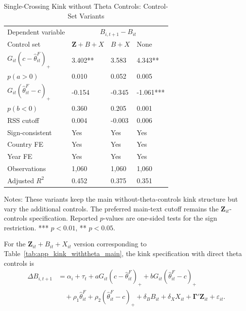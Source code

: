 \begin{table}[H]\centering
\caption{Single-Crossing Kink without Theta Controls: Control-Set Variants}
\label{tab:app_kink_notheta_controls}
\begin{threeparttable}
\scriptsize
\setlength{\tabcolsep}{3.0pt}
\begin{tabularx}{0.92\textwidth}{lYYY}
\toprule
Dependent variable &  \\
Control set & $\mathbf{Z}+B+X$ & $B+X$ & None \\
\midrule
$G_{it}(c-\widehat\theta^F_{it})_+$ & 3.402** & 3.583 & 4.343** \\
$p(a>0)$ & 0.010 & 0.052 & 0.005 \\
$G_{it}(\widehat\theta^F_{it}-c)_+$ & -0.154 & -0.345 & -1.061*** \\
$p(b<0)$ & 0.360 & 0.205 & 0.001 \\
\midrule
RSS cutoff & 0.004 & -0.003 & 0.006 \\
Sign-consistent & Yes & Yes & Yes \\
Country FE & Yes & Yes & Yes \\
Year FE & Yes & Yes & Yes \\
Observations & 1,060 & 1,060 & 1,060 \\
Adjusted $R^2$ & 0.452 & 0.375 & 0.351 \\
\bottomrule
\end{tabularx}
\begin{tablenotes}[flushleft]\footnotesize
\item Notes: These variants keep the main without-theta-controls kink structure but vary the additional controls. The preferred main-text cutoff remains the $\mathbf{Z}_{it}$-controls specification. Reported $p$-values are one-sided tests for the sign restriction. *** $p<0.01$, ** $p<0.05$.
\end{tablenotes}
\end{threeparttable}
\end{table}

For the $\mathbf{Z}_{it}+B_{it}+X_{it}$ version corresponding to Table~\ref{tab:app_kink_withtheta_main}, the kink specification with direct theta controls is
\begin{equation}
\begin{aligned}
\Delta B_{i,t+1}
&=
\alpha_i+\tau_t
+aG_{it}(c-\widehat\theta^F_{it})_+
+bG_{it}(\widehat\theta^F_{it}-c)_+ \\
&\quad
+\rho_1\widehat\theta^F_{it}
+\rho_2(\widehat\theta^F_{it}-c)_+
+\delta_B B_{it}
+\delta_X X_{it}
+\boldsymbol{\Gamma}'\mathbf{Z}_{it}
+\varepsilon_{it}.
\end{aligned}
\label{eq:app_kink_withtheta_zbx_main}
\end{equation}

